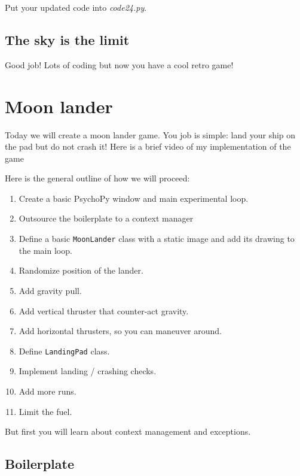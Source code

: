 \documentclass[
]{book}
\providecommand{\tightlist}{%
  \setlength{\itemsep}{0pt}\setlength{\parskip}{0pt}}
\begin{document}
Put your updated code into \emph{code24.py}.

\hypertarget{the-sky-is-the-limit}{%
\section{The sky is the limit}\label{the-sky-is-the-limit}}

Good job! Lots of coding but now you have a cool retro game!

\hypertarget{moon-lander}{%
\chapter{Moon lander}\label{moon-lander}}

Today we will create a moon lander game. You job is simple: land your ship on the pad but do not crash it! Here is a brief video of my implementation of the game

Here is the general outline of how we will proceed:

\begin{enumerate}
\def\labelenumi{\arabic{enumi}.}
\tightlist
\item
  Create a basic PsychoPy window and main experimental loop.
\item
  Outsource the boilerplate to a context manager
\item
  Define a basic \texttt{MoonLander} class with a static image and add its drawing to the main loop.
\item
  Randomize position of the lander.
\item
  Add gravity pull.
\item
  Add vertical thruster that counter-act gravity.
\item
  Add horizontal thrusters, so you can maneuver around.
\item
  Define \texttt{LandingPad} class.
\item
  Implement landing / crashing checks.
\item
  Add more runs.
\item
  Limit the fuel.
\end{enumerate}

But first you will learn about context management and exceptions.

\hypertarget{boilerplate-1}{%
\section{Boilerplate}\label{boilerplate-1}}
\end{document}
